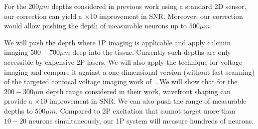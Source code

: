 	
For the $200\mu m$ depths considered in previous work using a standard 2D sensor, our correction can yield a $\times 10$ improvement in SNR. Moreover, our correction would allow pushing the depth of measurable neurons up to $500\mu m$.
	
	
	 We will push the depth where 1P imaging is applicable and apply calcium imaging  $500-700\mu m$ deep into the tissue. Currently such depths are only accessible by expensive 2P lasers. 
	We will also apply the technique for voltage imaging and compare it against a one dimensional version (without fast scanning) of the targeted confocal voltage imaging work of~\cite{Xiao2024LargeScale}. We will show that for the $200-300\mu m$ depth range considered in their work, wavefront shaping can provide a $\times 10$ improvement in SNR.  We can also push the range of measurable depths to $500\mu m$. Compared to 2P excitation that cannot target more than $10-20$ neurons simultaneously, our 1P system will measure hundreds of neurons. 

